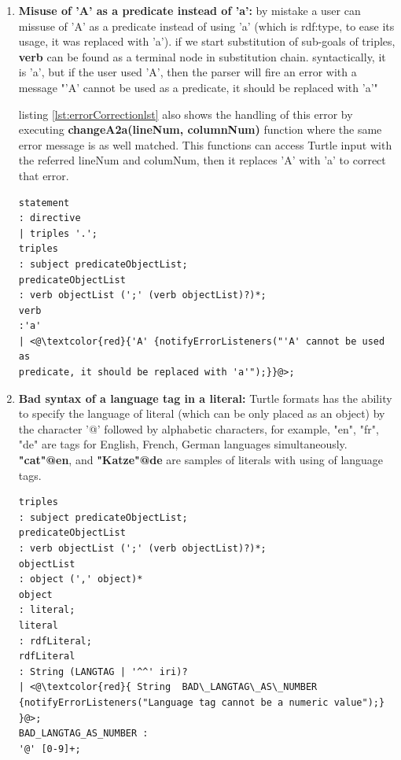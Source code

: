 \begin{enumerate}
    \item \textbf{Misuse of 'A'  as a predicate instead of 'a':} by mistake a user can missuse of 'A' as a predicate instead of using 'a' (which is rdf:type, to ease its usage, it was replaced with 'a'). if we start substitution of sub-goals of triples, \textbf{verb} can be found as a terminal node in  substitution chain. syntactically, it is 'a', but if the user used 'A', then the parser will fire an error with a message "’A’ cannot be used as a predicate, it should be replaced with ’a’" 
    
    	\vspace{5mm} %

    listing \ref{lst:errorCorrectionlst} also shows the handling of this error by executing \textbf{changeA2a(lineNum, columnNum)} function where the same error message is as well matched. This functions can access Turtle input with the referred lineNum and columNum, then it replaces 'A' with 'a' to correct that error. 
    	\vspace{5mm} %

    \begin{lstlisting}[label=lst:MissuseAex ,  caption={Detection a syntax error of misuse of 'A' as a predicate instead of 'a' in the grammar}] 
statement
: directive
| triples '.';
triples
: subject predicateObjectList;
predicateObjectList
: verb objectList (';' (verb objectList)?)*;
verb
:'a'
| <@\textcolor{red}{'A' {notifyErrorListeners("'A' cannot be used as
predicate, it should be replaced with 'a'");}}@>;
\end{lstlisting}
\item \textbf{Bad syntax of a language tag in a literal:} 
Turtle formats has the ability to specify the language of literal (which can be only placed as an object) by the character '@' followed by alphabetic characters, for example, "en", "fr", "de" are tags for English, French, German languages simultaneously. \textbf{"cat"@en}, and \textbf{"Katze"@de} are samples of literals with using of language tags.
\begin{lstlisting}[label=lst:badlaguageTag,  caption={Starting rules in the grammar file8}] 
triples
: subject predicateObjectList;
predicateObjectList
: verb objectList (';' (verb objectList)?)*;
objectList
: object (',' object)*
object
: literal;
literal
: rdfLiteral;
rdfLiteral
: String (LANGTAG | '^^' iri)?
| <@\textcolor{red}{ String  BAD\_LANGTAG\_AS\_NUMBER  {notifyErrorListeners("Language tag cannot be a numeric value");} }@>;
BAD_LANGTAG_AS_NUMBER : 
'@' [0-9]+;
\end{lstlisting}


\end{enumerate}
